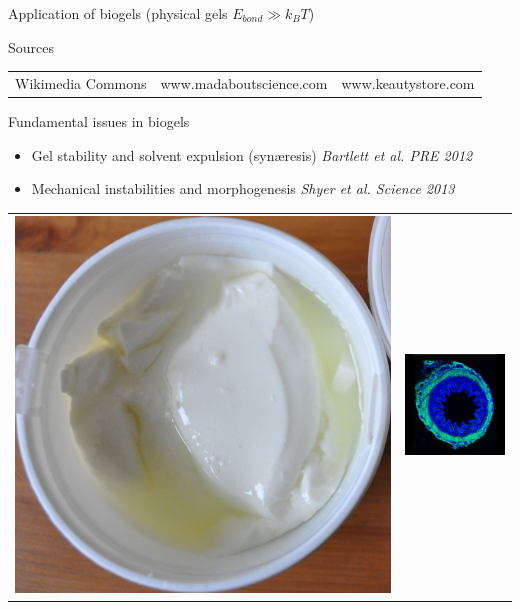 \documentclass[xcolor=table]{beamer}
\begin{document}
\begin{frame}{Application of biogels \textup{\normalsize(physical gels
$E_{bond}\gg k_B T$)}}
\begin{footnotesize}
\begin{block}{Sources}
\begin{tabu}{lXl}
Wikimedia Commons & www.madaboutscience.com & www.keautystore.com\\
\end{tabu}
\end{block}
\end{footnotesize}
\end{frame}



\begin{frame}{Fundamental issues in biogels}
\begin{itemize}
\item Gel stability and solvent expulsion (syn\ae{}resis) \textit{\scriptsize Bartlett et al. PRE 2012}
\item Mechanical instabilities and morphogenesis \textit{\scriptsize Shyer et al. Science 2013}
\end{itemize}
\begin{tabu}{X[c]X[c]}
\includegraphics[height=8\baselineskip]{faisselle} &
\includegraphics[height=8\baselineskip]{Villi_sq}

\end{tabu}
\end{frame}
\end{document}
